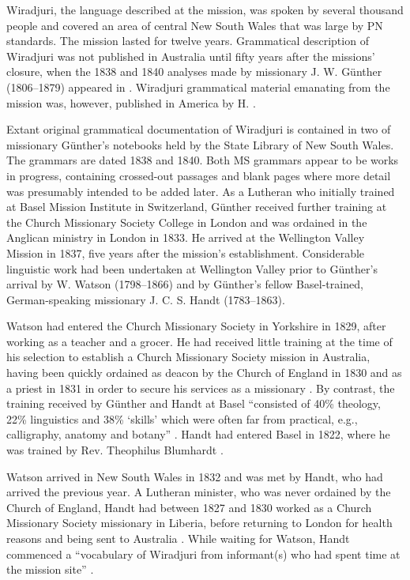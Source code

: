 Wiradjuri, the language described at the mission, was spoken by several thousand people \citep[317]{Krzywieki1934} and covered an area of central New South Wales that was large by PN standards. The mission lasted for twelve years. Grammatical description of Wiradjuri was not published in Australia until fifty years after the missions' closure, when the 1838 and 1840 analyses made by missionary J. W. Günther (1806--1879) appeared in \citet{gunther_grammar_1892}. Wiradjuri grammatical material emanating from the mission was, however, published in America by H. \citet{hale_languages_1846}.

Extant original grammatical documentation of Wiradjuri is contained in two of missionary Günther’s notebooks held by the State Library of New South Wales. The grammars are dated 1838 and 1840. Both MS grammars appear to be works in progress, containing crossed-out passages and blank pages where more detail was presumably intended to be added later. As a Lutheran who initially trained at Basel Mission Institute in Switzerland, Günther received further training at the Church Missionary Society College in London and was ordained in the Anglican ministry in London in 1833. He arrived at the Wellington Valley Mission in 1837, five years after the mission’s establishment. Considerable linguistic work had been undertaken at Wellington Valley prior to Günther’s arrival \citep{bridges_church_1978} by W. Watson (1798–1866) and by Günther’s fellow Basel-trained, German-speaking missionary J. C. S. Handt (1783--1863).

Watson had entered the Church Missionary Society in Yorkshire in 1829, after working as a teacher and a grocer. He had received little training at the time of his selection to establish a Church Missionary Society mission in Australia, having been quickly ordained as deacon by the Church of England in 1830 and as a priest in 1831 in order to secure his services as a missionary \citep[256--263]{bridges_church_1978}. By contrast, the training received by Günther and Handt at Basel “consisted of 40\% theology, 22\% linguistics and 38\% `skills' which were often far from practical, e.g., calligraphy, anatomy and botany” \citep[45]{allen_2011}. Handt had entered Basel in 1822, where he was trained by Rev. Theophilus Blumhardt \citep[264]{bridges_church_1978}.

Watson arrived in New South Wales in 1832 and was met by Handt, who had arrived the previous year. A Lutheran minister, who was never ordained by the Church of England, Handt had between 1827 and 1830 worked as a Church Missionary Society missionary in Liberia, before returning to London for health reasons and being sent to Australia \citep[263]{bridges_church_1978}. While waiting for Watson, Handt commenced a “vocabulary of Wiradjuri from informant(s) who had spent time at the mission site” \citep[292]{bridges_church_1978}. 

